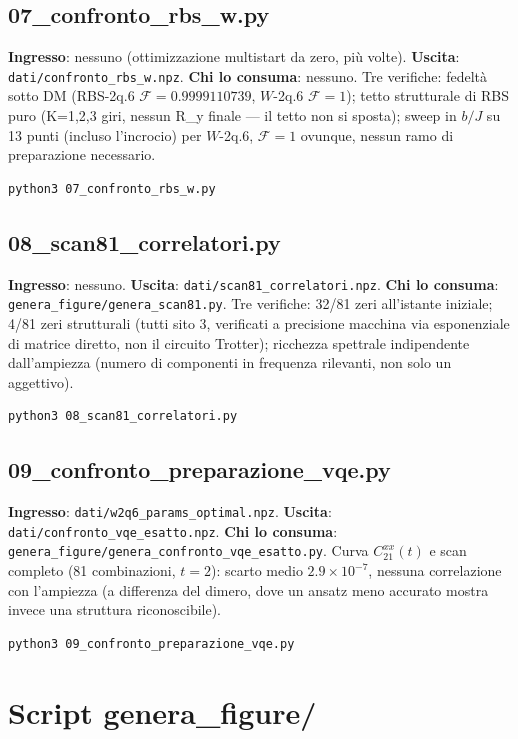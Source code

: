 \documentclass[11pt,a4paper]{article}
\begin{document}
\subsection{07\_confronto\_rbs\_w.py}
\textbf{Ingresso}: nessuno (ottimizzazione multistart da zero, più
volte). \textbf{Uscita}: \texttt{dati/confronto\_rbs\_w.npz}.
\textbf{Chi lo consuma}: nessuno. Tre verifiche: fedeltà sotto DM
(RBS-2q.6 $\mathcal F=0.9999110739$, $W$-2q.6 $\mathcal F=1$); tetto
strutturale di RBS puro (K=1,2,3 giri, nessun R\_y finale --- il tetto
non si sposta); sweep in $b/J$ su 13 punti (incluso l'incrocio) per
$W$-2q.6, $\mathcal F=1$ ovunque, nessun ramo di preparazione
necessario.
\begin{verbatim}
python3 07_confronto_rbs_w.py
\end{verbatim}

\subsection{08\_scan81\_correlatori.py}
\textbf{Ingresso}: nessuno. \textbf{Uscita}:
\texttt{dati/scan81\_correlatori.npz}. \textbf{Chi lo consuma}:
\texttt{genera\_figure/genera\_scan81.py}. Tre verifiche: 32/81 zeri
all'istante iniziale; 4/81 zeri strutturali (tutti sito 3, verificati a
precisione macchina via esponenziale di matrice diretto, non il
circuito Trotter); ricchezza spettrale indipendente dall'ampiezza
(numero di componenti in frequenza rilevanti, non solo un aggettivo).
\begin{verbatim}
python3 08_scan81_correlatori.py
\end{verbatim}

\subsection{09\_confronto\_preparazione\_vqe.py}
\textbf{Ingresso}: \texttt{dati/w2q6\_params\_optimal.npz}.
\textbf{Uscita}: \texttt{dati/confronto\_vqe\_esatto.npz}. \textbf{Chi
lo consuma}: \texttt{genera\_figure/genera\_confronto\_vqe\_esatto.py}.
Curva $C_{21}^{xx}(t)$ e scan completo (81 combinazioni, $t{=}2$):
scarto medio $2.9\times10^{-7}$, nessuna correlazione con l'ampiezza
(a differenza del dimero, dove un ansatz meno accurato mostra invece
una struttura riconoscibile).
\begin{verbatim}
python3 09_confronto_preparazione_vqe.py
\end{verbatim}

\section{Script genera\_figure/}
\end{document}
